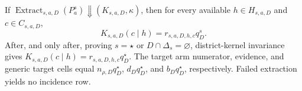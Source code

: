 If \(\operatorname{Extract}_{s,a,D}(P_a^s)\Downarrow(K_{s,a,D},\kappa)\), then for every available \(h\in H_{s,a,D}\) and \(c\in C_{s,a,D}\), \[K_{s,a,D}(c\mid h)=r_{s,a,D,h,c}q_D^s.\] After, and only after, proving \(s=\star\) or \(D\cap\Delta_s=\varnothing\), district-kernel invariance gives \(K_{s,a,D}(c\mid h)=r_{s,a,D,h,c}q_D^\star\). The target arm numerator, evidence, and generic target cells equal \(n_{\rho,D}q_D^\star\), \(d_Dq_D^\star\), and \(b_Dq_D^\star\), respectively. Failed extraction yields no incidence row.